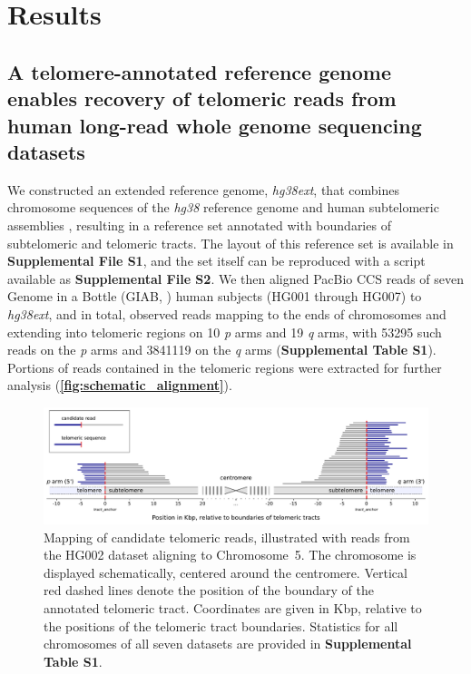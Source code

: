 \documentclass{article}
\begin{document}
\section*{Results} 

\subsection*{A telomere-annotated reference genome enables recovery of telomeric reads from human long-read whole genome sequencing datasets}
    We constructed an extended reference genome, \textit{hg38ext},
        that combines chromosome sequences of the \textit{hg38} reference genome \parencite{grch38,hg38}
            and human subtelomeric assemblies \parencite{riethman2014},
        resulting in a reference set annotated with boundaries of subtelomeric and telomeric tracts.
        The layout of this reference set is available in \textbf{Supplemental File S1},
            and the set itself can be reproduced with a script available as \textbf{Supplemental File S2}.
    We then aligned PacBio CCS reads of seven Genome in a Bottle (GIAB, \parencite{giab}) human subjects (HG001 through HG007) to \textit{hg38ext},
        and in total, observed reads mapping to the ends of chromosomes and extending into telomeric regions
            on 10 \textit{p} arms and 19 \textit{q} arms,
                with 53\textendash{}295 such reads on the \textit{p} arms
                and 384\textendash{}1119 on the \textit{q} arms
                    (\textbf{Supplemental Table S1}).
    Portions of reads contained in the telomeric regions were extracted for further analysis (\textbf{\autoref{fig:schematic_alignment}}).
        \begin{figure}[h!] \centering %
        \includegraphics[height=.75\textheight,width=\textwidth,keepaspectratio]{../figures/Figure_1.pdf}
        \caption{
             \small Mapping of candidate telomeric reads, illustrated with reads from the HG002 dataset aligning to \mbox{Chromosome 5.}
             The chromosome is displayed schematically, centered around the centromere.
             Vertical red dashed lines denote the position of the boundary of the annotated telomeric tract.
             Coordinates are given in Kbp, relative to the positions of the telomeric tract boundaries.
             Statistics for all chromosomes of all seven datasets are provided in \textbf{Supplemental Table S1}.
        }
        \label{fig:schematic_alignment}
        \end{figure}
\end{document}
